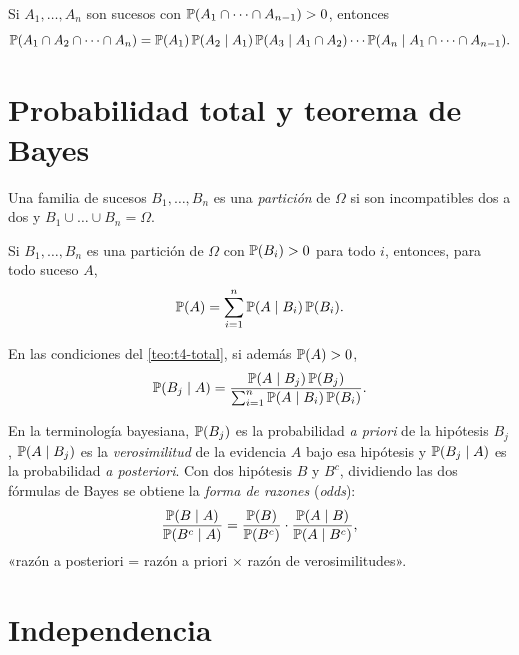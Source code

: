 \begin{teorema}\label{teo:t4-cadena}
Si $A_1,\dots,A_n$ son sucesos con $\mathbb{P}(A_1\cap\dots\cap A_{n-1})>0$, entonces
\[
\mathbb{P}(A_1\cap A_2\cap\dots\cap A_n)=\mathbb{P}(A_1)\,\mathbb{P}(A_2\mid A_1)\,\mathbb{P}(A_3\mid A_1\cap A_2)\cdots\mathbb{P}(A_n\mid A_1\cap\dots\cap A_{n-1}).
\]
\end{teorema}

\addtocounter{definicion}{1}%

\section{Probabilidad total y teorema de Bayes}

\begin{definicion}
Una familia de sucesos $B_1,\dots,B_n$ es una \emph{partición} de $\Omega$ si son incompatibles dos a dos y $B_1\cup\dots\cup B_n=\Omega$.
\end{definicion}

\begin{teorema}\label{teo:t4-total}
Si $B_1,\dots,B_n$ es una partición de $\Omega$ con $\mathbb{P}(B_i)>0$ para todo $i$, entonces, para todo suceso $A$,
\[
\mathbb{P}(A)=\sum_{i=1}^{n}\mathbb{P}(A\mid B_i)\,\mathbb{P}(B_i).
\]
\end{teorema}

\begin{teorema}[Bayes]\label{teo:t4-bayes}
En las condiciones del \cref{teo:t4-total}, si además $\mathbb{P}(A)>0$,
\[
\mathbb{P}(B_j\mid A)=\frac{\mathbb{P}(A\mid B_j)\,\mathbb{P}(B_j)}{\sum_{i=1}^{n}\mathbb{P}(A\mid B_i)\,\mathbb{P}(B_i)}.
\]
\end{teorema}

En la terminología bayesiana, $\mathbb{P}(B_j)$ es la probabilidad \emph{a priori} de la hipótesis $B_j$, $\mathbb{P}(A\mid B_j)$ es la \emph{verosimilitud} de la evidencia $A$ bajo esa hipótesis y $\mathbb{P}(B_j\mid A)$ es la probabilidad \emph{a posteriori}. Con dos hipótesis $B$ y $B^{c}$, dividiendo las dos fórmulas de Bayes se obtiene la \emph{forma de razones} (\emph{odds}):
\[
\frac{\mathbb{P}(B\mid A)}{\mathbb{P}(B^{c}\mid A)}=\frac{\mathbb{P}(B)}{\mathbb{P}(B^{c})}\cdot\frac{\mathbb{P}(A\mid B)}{\mathbb{P}(A\mid B^{c})},
\]
«razón a posteriori = razón a priori $\times$ razón de verosimilitudes».

\addtocounter{definicion}{1}%

\addtocounter{definicion}{1}%

\section{Independencia}

